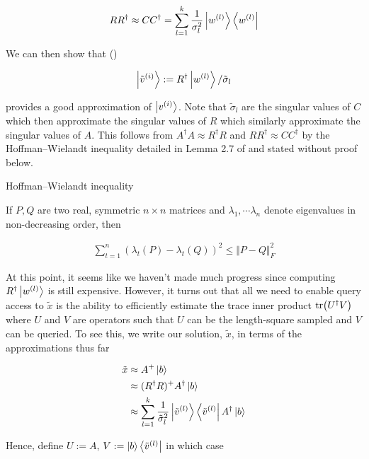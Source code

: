 \documentclass[main.tex]{subfiles}
\begin{document}
\begin{align*}
RR^\dag \approx CC^\dag = \sum_{l=1}^k \frac{1}{\sigma_l^2}\ket{w^{(l)}}\bra{w^{(l)}}
\end{align*}


We can then show that ()

\begin{align}
\label{def:approx-right}
\ket{\tilde{v}^{(i)}} := R^\dag \ket{w^{(l)}} / \tilde{\sigma}_l
\end{align}

provides a good approximation of $\ket{v^{(i)}}$. Note that $\tilde{\sigma}_l$ are the singular values of $C$ which then approximate the singular values of $R$ which similarly approximate the singular values of $A$. This follows from $A^\dag A \approx R^\dag R$ and $RR^\dag \approx CC^\dag$ by the Hoffman--Wielandt inequality detailed in Lemma 2.7 of \cite{kannan2017randomized} and stated without proof below.

\begin{lemma}Hoffman--Wielandt inequality

	If $P, Q$ are two real, symmetric $n \times n$ matrices and $\lambda_1, \cdots \lambda_n$ denote eigenvalues in non-decreasing order, then
	
	\begin{align*}
		\sum_{t=1}^n(\lambda_t(P) - \lambda_t(Q))^2 \leq \Vert P - Q \Vert_F^2
	\end{align*}
\end{lemma}


At this point, it seems like we haven't made much progress since computing $R^\dag \ket{w^{(l)}}$ is still expensive. However, it turns out that all we need to enable query access to $\tilde{x}$ is the ability to efficiently estimate the trace inner product $\tr(U^\dag V)$ where $U$ and $V$ are operators such that $U$ can be the length-square sampled and $V$ can be queried. To see this, we write our solution, $\tilde{x}$, in terms of the approximations thus far

\begin{align*}
	\tilde{x} &\approx A^+ \ket{b} \\
	&\approx (R^\dag R)^+ A^\dag \ket{b}\\
	&\approx \sum_{l = 1}^k \frac{1}{\tilde{\sigma}_l^2} \ket{\tilde{v}^{(l)}} \bra{\tilde{v}^{(l)}} A^\dag \ket{b}
\end{align*}

Hence, define $U := A$, $V := \ket{b}\bra{\tilde{v}^{(l)}}$ in which case 
\end{document}
